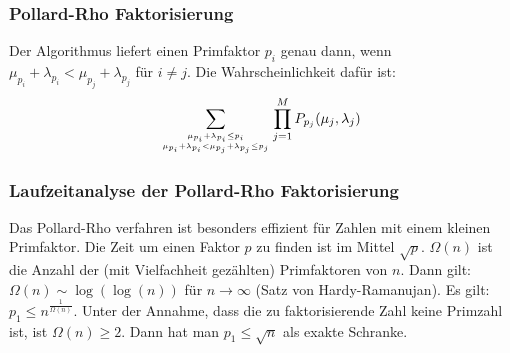 \documentclass{beamer}
\begin{document}

\begin{frame}
	\frametitle{Pollard-Rho Faktorisierung}

	Der Algorithmus liefert einen Primfaktor \(p_i\) genau dann,
	wenn \( \mu_{p_i} + \lambda_{p_i} < \mu_{p_j} + \lambda_{p_j} \) für \(i \neq j\).
	Die Wahrscheinlichkeit dafür ist:
	\begin{align*}
		  \sum_{\mu_{p_i} + \lambda_{p_i} \leq p_i \atop \mu_{p_i} + \lambda_{p_i} < \mu_{p_j} + \lambda_{p_j} \leq p_j} \prod_{j=1}^M P_{p_j}(\mu_j,\lambda_j) \\
	\end{align*}

\end{frame}


\begin{frame}
	\frametitle{Laufzeitanalyse der Pollard-Rho Faktorisierung}
	
	Das Pollard-Rho verfahren ist besonders effizient für Zahlen mit einem kleinen Primfaktor.
	Die Zeit um einen Faktor \(p\) zu finden ist im Mittel \(\sqrt{p}\).
	\(\Omega(n)\) ist die Anzahl der (mit Vielfachheit gezählten) Primfaktoren von \(n\).
	Dann gilt: \(\Omega(n) \sim \log(\log(n))\) für \(n \to \infty \) (Satz von Hardy-Ramanujan).
	Es gilt: \(p_1 \leq n^{\frac{1}{\Omega(n)}}\).
	Unter der Annahme, dass die zu faktorisierende Zahl keine Primzahl ist, ist \(\Omega(n) \geq 2\).
	Dann hat man \(p_1 \leq \sqrt{n}\) als exakte Schranke.

\end{frame}

\end{document}
